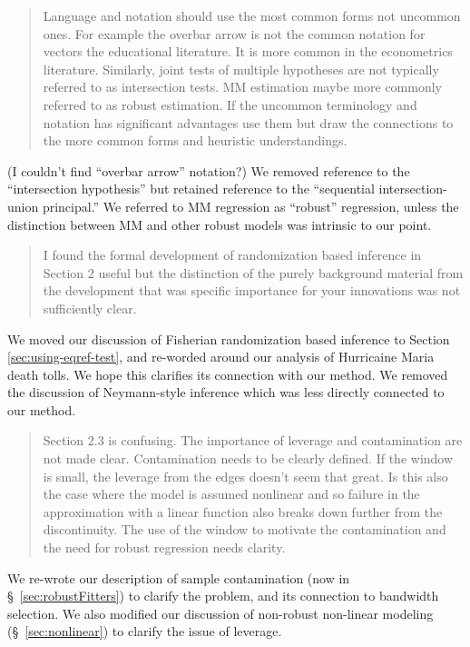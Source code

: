 \documentclass[12pt]{article}
\begin{document}
\begin{itemize}
\begin{quote}
Language and notation should use the most common forms not
uncommon ones. For example the overbar arrow is not the common
notation for vectors the educational literature. It is more common in
the econometrics literature. Similarly, joint tests of multiple
hypotheses are not typically referred to as intersection tests. MM
estimation maybe more commonly referred to as robust estimation. If
the uncommon terminology and notation has significant advantages use
them but draw the connections to the more common forms and heuristic
understandings.
\end{quote}
(I couldn't find ``overbar arrow'' notation?) We removed reference to
the ``intersection hypothesis'' but retained reference to the
``sequential intersection-union principal.'' We referred to MM
regression as ``robust'' regression, unless the distinction between MM
and other robust models was intrinsic to our point.

\begin{quote}
I found the formal development of randomization based inference in
Section 2 useful but the distinction of the purely background material
from the development that was specific importance for your innovations
was not sufficiently clear.
\end{quote}
We moved our discussion of Fisherian randomization based inference to
Section \ref{sec:using-eqref-test}, and re-worded around our
analysis of Hurricaine Maria death tolls. We hope this clarifies its
connection with our method. We removed the discussion of Neymann-style
inference which was less directly connected to our method.

\begin{quote}
Section 2.3 is confusing. The importance of leverage and contamination
are not made clear. Contamination needs to be clearly defined. If the
window is small, the leverage from the edges doesn’t seem that
great. Is this also the case where the model is assumed nonlinear and
so failure in the approximation with a linear function also breaks
down further from the discontinuity. The use of the window to motivate
the contamination and the need for robust regression needs clarity.
\end{quote}
We re-wrote our description of sample contamination (now in
\S~\ref{sec:robustFitters}) to clarify the problem, and its connection
to bandwidth selection.
We also modified our discussion of non-robust non-linear modeling
(\S~\ref{sec:nonlinear}) to clarify the issue of leverage.


\end{itemize}
\end{document}
